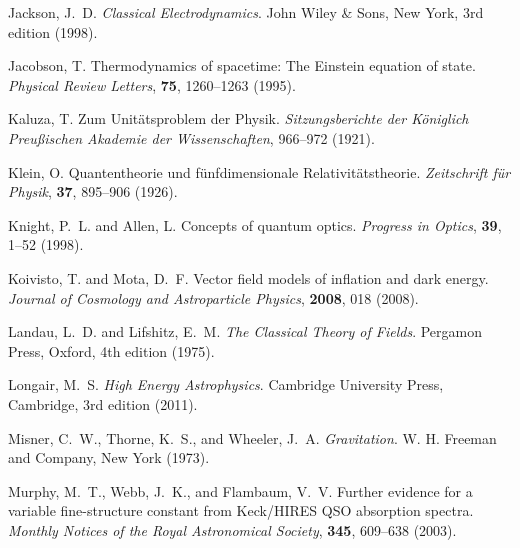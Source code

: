 \documentclass[12pt,a4paper]{article}
\begin{document}
\begin{thebibliography}{99}
		Jackson, J.~D.
		\newblock \textit{Classical Electrodynamics}.
		\newblock John Wiley \& Sons, New York, 3rd edition (1998).
		
		Jacobson, T.
		\newblock Thermodynamics of spacetime: The Einstein equation of state.
		\newblock \textit{Physical Review Letters}, \textbf{75}, 1260--1263 (1995).
		\newblock {}
		
		Kaluza, T.
		\newblock Zum Unitätsproblem der Physik.
		\newblock \textit{Sitzungsberichte der Königlich Preußischen Akademie der Wissenschaften}, 966--972 (1921).
		
		Klein, O.
		\newblock Quantentheorie und fünfdimensionale Relativitätstheorie.
		\newblock \textit{Zeitschrift für Physik}, \textbf{37}, 895--906 (1926).
		\newblock {}
		
		Knight, P.~L. and Allen, L.
		\newblock Concepts of quantum optics.
		\newblock \textit{Progress in Optics}, \textbf{39}, 1--52 (1998).
		\newblock {}
		
		Koivisto, T. and Mota, D.~F.
		\newblock Vector field models of inflation and dark energy.
		\newblock \textit{Journal of Cosmology and Astroparticle Physics}, \textbf{2008}, 018 (2008).
		\newblock {}
		
		Landau, L.~D. and Lifshitz, E.~M.
		\newblock \textit{The Classical Theory of Fields}.
		\newblock Pergamon Press, Oxford, 4th edition (1975).
		
		Longair, M.~S.
		\newblock \textit{High Energy Astrophysics}.
		\newblock Cambridge University Press, Cambridge, 3rd edition (2011).
		
		Misner, C.~W., Thorne, K.~S., and Wheeler, J.~A.
		\newblock \textit{Gravitation}.
		\newblock W. H. Freeman and Company, New York (1973).
		
		Murphy, M.~T., Webb, J.~K., and Flambaum, V.~V.
		\newblock Further evidence for a variable fine-structure constant from Keck/HIRES QSO absorption spectra.
		\newblock \textit{Monthly Notices of the Royal Astronomical Society}, \textbf{345}, 609--638 (2003).
		\newblock {}
		

\end{thebibliography}
\end{document}
